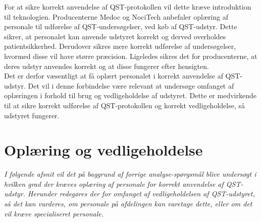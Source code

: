 For at sikre korrekt anvendelse af QST-protokollen vil dette kræve introduktion til teknologien. Producenterne Medoc og NociTech anbefaler oplæring af personale til udførelse af QST-undersøgelser, ved køb af QST-udstyr. Dette sikrer, at personalet kan anvende udstyret korrekt og derved overholdes patientsikkerhed. Derudover sikres mere korrekt udførelse af undersøgelser, hvormed disse vil have større præcision. Ligeledes sikres det for producenterne, at deres udstyr anvendes korrekt og at disse fungerer efter hensigten.\\
Det er derfor væsentligt at få oplært personalet i korrekt anvendelse af QST-udstyr. Det vil i denne forbindelse være relevant at undersøge omfanget af oplæringen i forhold til brug og vedligeholdelse af udstyret. Dette er medvirkende til at sikre korrekt udførelse af QST-protokollen og korrekt vedligeholdelse, så udstyret fungerer.

\section{Oplæring og vedligeholdelse}
\textit{I følgende afsnit vil det på baggrund af forrige analyse-spørgsmål blive undersøgt i hvilken grad der kræves oplæring af personale for korrekt anvendelse af QST-udstyr. Herunder redegøres der for omfanget af vedligeholdelsen af QST-udstyret, så det kan vurderes, om personale på afdelingen kan varetage dette, eller om det vil kræve specialiseret personale.}

